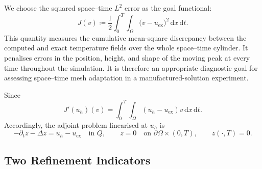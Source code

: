 We choose the squared space--time \(L^2\) error as the goal functional:
\begin{equation}
  J(v)
  \coloneqq
  \frac12\int_0^T\!\int_\Omega
  \bigl(v-u_{\mathrm{ex}}\bigr)^2
  \,\mathrm{d}x\,\mathrm{d}t.
  \label{eq:mh-goal}
\end{equation}
This quantity measures the cumulative mean-square discrepancy between the computed and exact temperature fields over the whole space--time cylinder. It penalises errors in the position, height, and shape of the moving peak at every time throughout the simulation. It is therefore an appropriate diagnostic goal for assessing space--time mesh adaptation in a manufactured-solution experiment.

Since
\begin{equation*}
  J'(u_h)(v)
  =
  \int_0^T\!\int_\Omega
  (u_h-u_{\mathrm{ex}})v
  \,\mathrm{d}x\,\mathrm{d}t.
  \label{eq:mh-goal-derivative}
\end{equation*}
Accordingly, the adjoint problem linearised at $u_h$ is
\begin{equation}
  -\partial_t z-\Delta z
  =
  u_h-u_{\mathrm{ex}}
  \quad\text{in }Q,
  \qquad
  z=0
  \quad\text{on }\partial\Omega\times(0,T),
  \qquad
  z(\cdot,T)=0.
  \label{eq:mh-adjoint}
\end{equation}


\subsection{Two Refinement Indicators}


